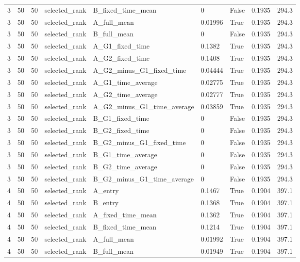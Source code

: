 \begin{longtable}{lllllllll}
3 & 50 & 50 & selected\_rank & B\_fixed\_time\_mean & 0 & False & 0.1935 & 294.3 \\
3 & 50 & 50 & selected\_rank & A\_full\_mean & 0.01996 & True & 0.1935 & 294.3 \\
3 & 50 & 50 & selected\_rank & B\_full\_mean & 0 & False & 0.1935 & 294.3 \\
3 & 50 & 50 & selected\_rank & A\_G1\_fixed\_time & 0.1382 & True & 0.1935 & 294.3 \\
3 & 50 & 50 & selected\_rank & A\_G2\_fixed\_time & 0.1408 & True & 0.1935 & 294.3 \\
3 & 50 & 50 & selected\_rank & A\_G2\_minus\_G1\_fixed\_time & 0.04444 & True & 0.1935 & 294.3 \\
3 & 50 & 50 & selected\_rank & A\_G1\_time\_average & 0.02775 & True & 0.1935 & 294.3 \\
3 & 50 & 50 & selected\_rank & A\_G2\_time\_average & 0.02777 & True & 0.1935 & 294.3 \\
3 & 50 & 50 & selected\_rank & A\_G2\_minus\_G1\_time\_average & 0.03859 & True & 0.1935 & 294.3 \\
3 & 50 & 50 & selected\_rank & B\_G1\_fixed\_time & 0 & False & 0.1935 & 294.3 \\
3 & 50 & 50 & selected\_rank & B\_G2\_fixed\_time & 0 & False & 0.1935 & 294.3 \\
3 & 50 & 50 & selected\_rank & B\_G2\_minus\_G1\_fixed\_time & 0 & False & 0.1935 & 294.3 \\
3 & 50 & 50 & selected\_rank & B\_G1\_time\_average & 0 & False & 0.1935 & 294.3 \\
3 & 50 & 50 & selected\_rank & B\_G2\_time\_average & 0 & False & 0.1935 & 294.3 \\
3 & 50 & 50 & selected\_rank & B\_G2\_minus\_G1\_time\_average & 0 & False & 0.1935 & 294.3 \\
4 & 50 & 50 & selected\_rank & A\_entry & 0.1467 & True & 0.1904 & 397.1 \\
4 & 50 & 50 & selected\_rank & B\_entry & 0.1368 & True & 0.1904 & 397.1 \\
4 & 50 & 50 & selected\_rank & A\_fixed\_time\_mean & 0.1362 & True & 0.1904 & 397.1 \\
4 & 50 & 50 & selected\_rank & B\_fixed\_time\_mean & 0.1214 & True & 0.1904 & 397.1 \\
4 & 50 & 50 & selected\_rank & A\_full\_mean & 0.01992 & True & 0.1904 & 397.1 \\
4 & 50 & 50 & selected\_rank & B\_full\_mean & 0.01949 & True & 0.1904 & 397.1 \\

\end{longtable}
